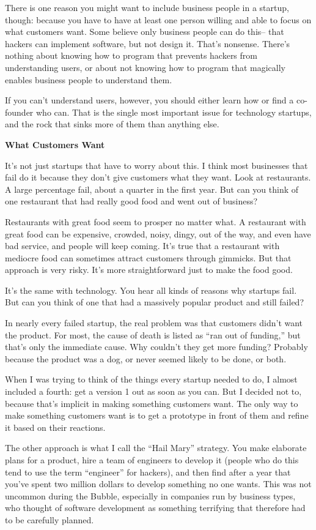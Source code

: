 \documentclass[12pt]{book}
\begin{document}
There is one reason you might want to include business people in a
startup, though: because you have to have at least one person willing
and able to focus on what customers want. Some believe only business
people can do this-- that hackers can implement software, but not design
it. That's nonsense. There's nothing about knowing how to program that
prevents hackers from understanding users, or about not knowing how to
program that magically enables business people to understand them.

If you can't understand users, however, you should either learn how or
find a co-founder who can. That is the single most important issue for
technology startups, and the rock that sinks more of them than anything
else.

\textbf{What Customers Want}

It's not just startups that have to worry about this. I think most
businesses that fail do it because they don't give customers what they
want. Look at restaurants. A large percentage fail, about a quarter in
the first year. But can you think of one restaurant that had really good
food and went out of business?

Restaurants with great food seem to prosper no matter what. A restaurant
with great food can be expensive, crowded, noisy, dingy, out of the way,
and even have bad service, and people will keep coming. It's true that a
restaurant with mediocre food can sometimes attract customers through
gimmicks. But that approach is very risky. It's more straightforward
just to make the food good.

It's the same with technology. You hear all kinds of reasons why
startups fail. But can you think of one that had a massively popular
product and still failed?

In nearly every failed startup, the real problem was that customers
didn't want the product. For most, the cause of death is listed as ``ran
out of funding,'' but that's only the immediate cause. Why couldn't they
get more funding? Probably because the product was a dog, or never
seemed likely to be done, or both.

When I was trying to think of the things every startup needed to do, I
almost included a fourth: get a version 1 out as soon as you can. But I
decided not to, because that's implicit in making something customers
want. The only way to make something customers want is to get a
prototype in front of them and refine it based on their reactions.

The other approach is what I call the ``Hail Mary'' strategy. You make
elaborate plans for a product, hire a team of engineers to develop it
(people who do this tend to use the term ``engineer'' for hackers), and
then find after a year that you've spent two million dollars to develop
something no one wants. This was not uncommon during the Bubble,
especially in companies run by business types, who thought of software
development as something terrifying that therefore had to be carefully
planned.
\end{document}
